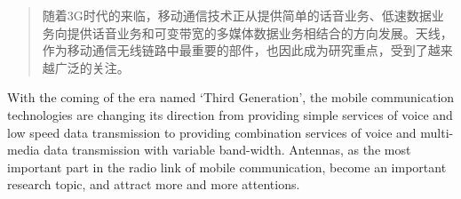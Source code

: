 
\begin{abstract}

  随着3G时代的来临，移动通信技术正从提供简单的话音业务、低速数据业务向提供话音业务和可变带宽的多媒体数据业务相结合的方向发展。天线，作为移动通信无线链路中最重要的部件，也因此成为研究重点，受到了越来越广泛的关注。
\end{abstract}

\begin{abstract*}

  With the coming of the era named ‘Third Generation’, the mobile communication technologies are changing its direction from providing simple services of voice and low speed data transmission to providing combination services of voice and multi-media data transmission with variable band-width. Antennas, as the most important part in the radio link of mobile communication, become an important research topic, and attract more and more attentions.

\end{abstract*}
